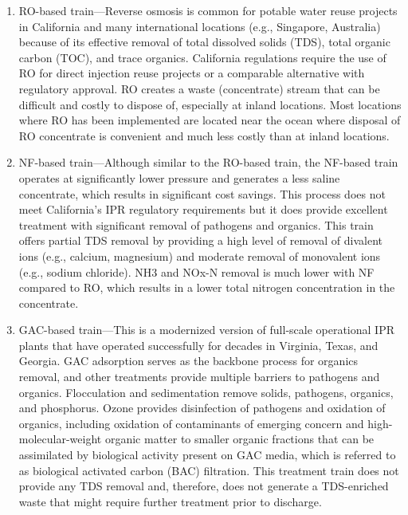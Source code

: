\documentclass{article}
\begin{document}
\begin{enumerate}
\item
  RO-based train---Reverse osmosis is common for potable water reuse
  projects in California and many international locations (e.g.,
  Singapore, Australia) because of its effective removal of total
  dissolved solids (TDS), total organic carbon (TOC), and trace
  organics. California regulations require the use of RO for direct
  injection reuse projects or a comparable alternative with regulatory
  approval. RO creates a waste (concentrate) stream that can be
  difficult and costly to dispose of, especially at inland locations.
  Most locations where RO has been implemented are located near the
  ocean where disposal of RO concentrate is convenient and much less
  costly than at inland locations.
\item
  NF-based train---Although similar to the RO-based train, the NF-based
  train operates at significantly lower pressure and generates a less
  saline concentrate, which results in significant cost savings. This
  process does not meet California's IPR regulatory requirements but it
  does provide excellent treatment with significant removal of pathogens
  and organics. This train offers partial TDS removal by providing a
  high level of removal of divalent ions (e.g., calcium, magnesium) and
  moderate removal of monovalent ions (e.g., sodium chloride). NH3 and
  NOx-N removal is much lower with NF compared to RO, which results in a
  lower total nitrogen concentration in the concentrate.
\item
  GAC-based train---This is a modernized version of full-scale
  operational IPR plants that have operated successfully for decades in
  Virginia, Texas, and Georgia. GAC adsorption serves as the backbone
  process for organics removal, and other treatments provide multiple
  barriers to pathogens and organics. Flocculation and sedimentation
  remove solids, pathogens, organics, and phosphorus. Ozone provides
  disinfection of pathogens and oxidation of organics, including
  oxidation of contaminants of emerging concern and
  high-molecular-weight organic matter to smaller organic fractions that
  can be assimilated by biological activity present on GAC media, which
  is referred to as biological activated carbon (BAC) filtration. This
  treatment train does not provide any TDS removal and, therefore, does
  not generate a TDS-enriched waste that might require further treatment
  prior to discharge.
\end{enumerate}
\end{document}
